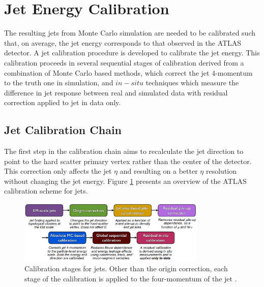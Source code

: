 \section{Jet Energy Calibration}
\label{Jet:Cal}
The resulting jets from Monte Carlo simulation are needed to be calibrated such that, on average, the jet energy corresponds to that observed in the ATLAS detector. A jet calibration procedure is developed to calibrate the jet energy. This calibration proceeds in several sequential stages of calibration derived from a combination of Monte Carlo based methods, which correct the jet 4-momentum to the truth one in simulation, and $in-situ$ techniques which measure the difference in jet response between real and simulated data with residual correction applied to jet in data only.
\subsection{Jet Calibration Chain}
\label{Jet:Cal:chain}
 The first step in the calibration chain aims to recalculate the jet direction to point to the hard scatter primary vertex rather than the center of the detector. This correction only affects the jet $\eta$ and resulting on a better $\eta$ resolution without changing the jet energy. Figure \ref{fig:Jet:Cal:chain} presents an overview of the  ATLAS calibration scheme for jets.
\begin{figure}[H]
     \centering
     \includegraphics[width=0.8\textwidth]{Ch4/Img/calibration_chain.png}
     \caption{Calibration stages for jets. Other than the origin correction, each stage of the calibration is applied to the four-momentum of the jet \cite{JES_Sys_13_TeV}.}
     \label{fig:Jet:Cal:chain}
 \end{figure}

